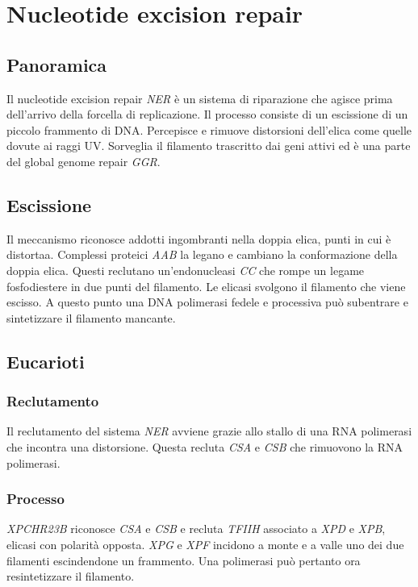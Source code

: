 \section{Nucleotide excision repair}

	\subsection{Panoramica}
	Il nucleotide excision repair \emph{NER} \`e un sistema di riparazione che agisce prima dell'arrivo della forcella di replicazione.
	Il processo consiste di un escissione di un piccolo frammento di DNA.
	Percepisce e rimuove distorsioni dell'elica come quelle dovute ai raggi UV.
	Sorveglia il filamento trascritto dai geni attivi ed \`e una parte del global genome repair \emph{GGR}.

	\subsection{Escissione}
	Il meccanismo riconosce addotti ingombranti nella doppia elica, punti in cui \`e distortaa.
	Complessi proteici \emph{AAB} la legano e cambiano la conformazione della doppia elica.
	Questi reclutano un'endonucleasi \emph{CC} che rompe un legame fosfodiestere in due punti del filamento.
	Le elicasi svolgono il filamento che viene escisso.
	A questo punto una DNA polimerasi fedele e processiva pu\`o subentrare e sintetizzare il filamento mancante.

	\subsection{Eucarioti}

		\subsubsection{Reclutamento}
		Il reclutamento del sistema \emph{NER} avviene grazie allo stallo di una RNA polimerasi che incontra una distorsione.
		Questa recluta \emph{CSA} e \emph{CSB} che rimuovono la RNA polimerasi.

		\subsubsection{Processo}
		\emph{XPCHR23B} riconosce \emph{CSA} e \emph{CSB} e recluta \emph{TFIIH} associato a \emph{XPD} e \emph{XPB}, elicasi con polarit\`a opposta.
		\emph{XPG} e \emph{XPF} incidono a monte e a valle uno dei due filamenti escindendone un frammento.
		Una polimerasi pu\`o pertanto ora resintetizzare il filamento.

